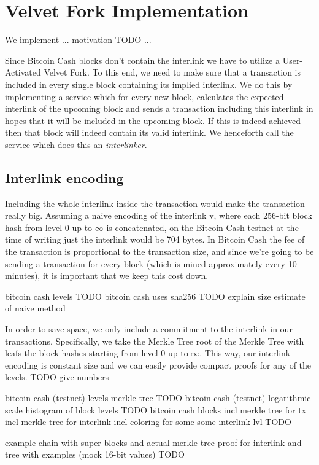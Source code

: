\chapter{Velvet Fork Implementation}
We implement ... motivation TODO ...

Since Bitcoin Cash blocks don't contain the interlink we have to utilize a User-Activated Velvet Fork. To this end, we need to make sure that a transaction is included in every single block containing its implied interlink. We do this by implementing a service which for every new block, calculates the expected interlink of the upcoming block and sends a transaction including this interlink in hopes that it will be included in the upcoming block. If this is indeed achieved then that block will indeed contain its valid interlink. We henceforth call the service which does this an \emph{interlinker}.

\section{Interlink encoding}
Including the whole interlink inside the transaction would make the transaction really big. Assuming a naive encoding of the interlink v, where each 256-bit block hash from level $0$ up to $\infty$ is concatenated, on the Bitcoin Cash testnet at the time of writing just the interlink would be 704 bytes. In Bitcoin Cash the fee of the transaction is proportional to the transaction size, and since we're going to be sending a transaction for every block (which is mined approximately every 10 minutes), it is important that we keep this cost down. 

bitcoin cash levels TODO
bitcoin cash uses sha256 TODO explain size estimate of naive method

In order to save space, we only include a commitment to the interlink in our transactions. Specifically, we take the Merkle Tree root of the Merkle Tree with leafs the block hashes starting from level $0$ up to $\infty$. This way, our interlink encoding is constant size and we can easily provide compact proofs for any of the levels. TODO give numbers

bitcoin cash (testnet) levels merkle tree TODO
bitcoin cash (testnet) logarithmic scale histogram of block levels TODO
bitcoin cash blocks incl merkle tree for tx incl merkle tree for interlink incl coloring for some some interlink lvl TODO

example chain with super blocks and actual merkle tree proof for interlink and tree with examples (mock 16-bit values) TODO

